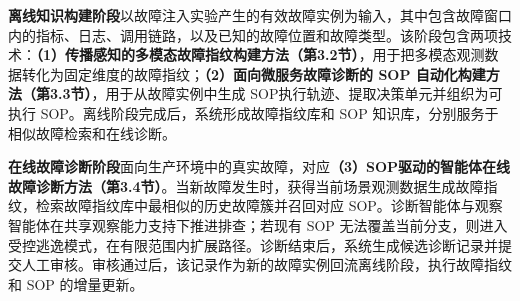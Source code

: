 \textbf{离线知识构建阶段}以故障注入实验产生的有效故障实例为输入，其中包含故障窗口内的指标、日志、调用链路，以及已知的故障位置和故障类型。该阶段包含两项技术：\textbf{（1）传播感知的多模态故障指纹构建方法（第3.2节）}，用于把多模态观测数据转化为固定维度的故障指纹；\textbf{（2）面向微服务故障诊断的 SOP 自动化构建方法（第3.3节）}，用于从故障实例中生成 SOP执行轨迹、提取决策单元并组织为可执行 SOP。离线阶段完成后，系统形成故障指纹库和 SOP 知识库，分别服务于相似故障检索和在线诊断。

\textbf{在线故障诊断阶段}面向生产环境中的真实故障，对应\textbf{（3）SOP驱动的智能体在线故障诊断方法（第3.4节）}。当新故障发生时，获得当前场景观测数据生成故障指纹，检索故障指纹库中最相似的历史故障簇并召回对应 SOP。诊断智能体与观察智能体在共享观察能力支持下推进排查；若现有 SOP 无法覆盖当前分支，则进入受控逃逸模式，在有限范围内扩展路径。诊断结束后，系统生成候选诊断记录并提交人工审核。审核通过后，该记录作为新的故障实例回流离线阶段，执行故障指纹和 SOP 的增量更新。
